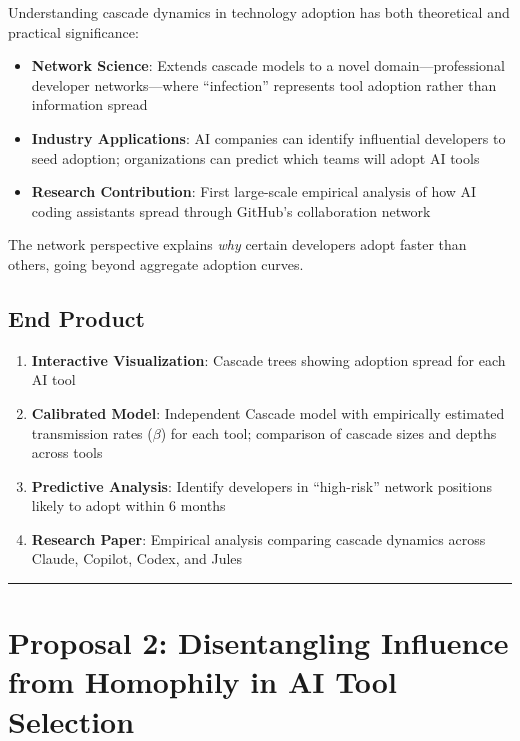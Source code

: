 \documentclass[11pt,letterpaper]{article}
\begin{document}
Understanding cascade dynamics in technology adoption has both theoretical and practical significance:

\begin{itemize}
    \item \textbf{Network Science}: Extends cascade models to a novel domain---professional developer networks---where ``infection'' represents tool adoption rather than information spread
    \item \textbf{Industry Applications}: AI companies can identify influential developers to seed adoption; organizations can predict which teams will adopt AI tools
    \item \textbf{Research Contribution}: First large-scale empirical analysis of how AI coding assistants spread through GitHub's collaboration network
\end{itemize}

The network perspective explains \textit{why} certain developers adopt faster than others, going beyond aggregate adoption curves.

\subsection*{End Product}

\begin{enumerate}
    \item \textbf{Interactive Visualization}: Cascade trees showing adoption spread for each AI tool
    \item \textbf{Calibrated Model}: Independent Cascade model with empirically estimated transmission rates ($\beta$) for each tool; comparison of cascade sizes and depths across tools
    \item \textbf{Predictive Analysis}: Identify developers in ``high-risk'' network positions likely to adopt within 6 months
    \item \textbf{Research Paper}: Empirical analysis comparing cascade dynamics across Claude, Copilot, Codex, and Jules
\end{enumerate}

\vspace{1em}
\hrule
\vspace{1em}

\section*{Proposal 2: Disentangling Influence from Homophily in AI Tool Selection}
\end{document}
